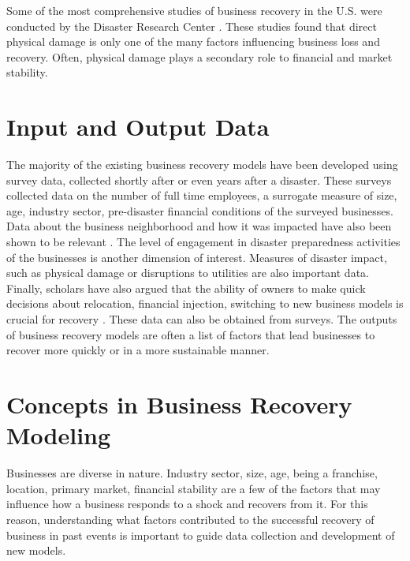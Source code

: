 Some of the most comprehensive studies of business recovery in the U.S. were conducted by the Disaster Research Center \citep{webb2000businesses}. These studies found that direct physical damage is only one of the many factors influencing business loss and recovery. Often, physical damage plays a secondary role to financial and market stability.\ 

\section{Input and Output Data} 
The majority of the existing business recovery models have been developed using survey data, collected shortly after or even years after a disaster. These surveys collected data on the number of full time employees, a surrogate measure of size, age, industry sector, pre-disaster financial conditions of the surveyed businesses. Data about the business neighborhood and how it was impacted have also been shown to be relevant \citep{chang2010urban}. The level of engagement in disaster preparedness activities of the businesses is another dimension of interest. Measures of disaster impact, such as physical damage or disruptions to utilities are also important data. Finally, scholars have also argued that the ability of owners to make quick decisions about relocation, financial injection, switching to new business models is crucial for recovery \citep{stevenson2014organizational,morrish2011entrepreneurial}. These data can also be obtained from surveys. The outputs of business recovery models are often a list of factors that lead businesses to recover more quickly or in a more sustainable manner.\

\section{Concepts in Business Recovery Modeling} 
Businesses are diverse in nature. Industry sector, size, age, being a franchise, location, primary market, financial stability are a few of the factors that may influence how a business responds to a shock and recovers from it. For this reason, understanding what factors contributed to the successful recovery of business in past events is important to guide data collection and development of new models.\ 

